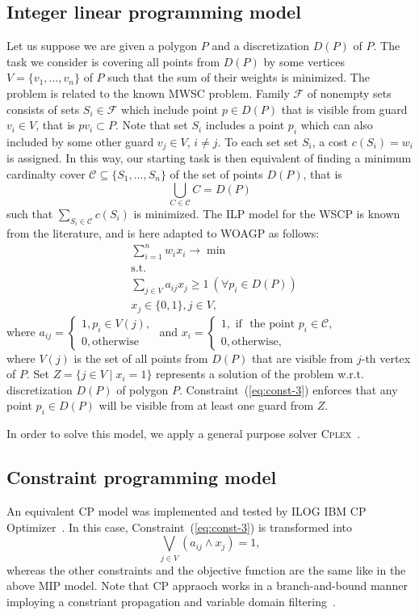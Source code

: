 \documentclass[runningheads,a4paper]{elsarticle}
\begin{document}
	\subsection{Integer linear programming model}
	Let us suppose we are given a polygon $P$ and a discretization $D(P)$ of $P$.  The task we consider is covering all points from $D(P)$ by some vertices $V=\{v_1,...,v_n\}$ of $P$ such that the sum of their weights is minimized.
	The problem is related to the known MWSC problem.
	Family $\mathcal{F}$ of nonempty sets consists of sets
	$S_i \in \mathcal{F}$ which include point $p \in D(P)$ that is visible from guard $v_i\in V$, that is $pv_i \subset P$.  Note that set $S_i$ includes a point $p_i$ which can also included by some other guard $v_j\in V$, $i \neq j$. To each set set $S_i$, a cost $c(S_i) = w_i$ is assigned.  In this way, our starting task is then equivalent of finding a minimum cardinalty cover $\mathcal{C}\subseteq\{S_1,...,S_n\}$ of the set of points $D(P)$, that is
	$$ \bigcup_{C \in \mathcal{C}} C = D(P)$$ such that $\sum_{S_i \in \mathcal{C}} c(S_i)$ is minimized.  The ILP  model for the WSCP is known from the literature, and is here adapted to WOAGP  as follows:
	\begin{align}
	&\sum_{i=1}^n w_ix_i \longrightarrow \min \\
	&\mbox{s.t.} \\
	&\sum_{j\in V} a_{ij}x_j \geq 1\ (\forall p_i\in D(P)) \label{eq:const-3}\\
	& x_j \in \{0,1\}, j \in V,
	\end{align}
	where
	$a_{ij} = \begin{cases}
	1, p_i \in V(j), \\
	0, \mbox{otherwise}
	\end{cases}$
	and $x_i = \begin{cases}
	1, \mbox{ if } \mbox{ the point } p_i \in \mathcal{C},\\
	0, \mbox{otherwise},
	\end{cases}$ \\
	where $V(j)$ is the set of all points from $D(P)$ that are visible from $j$-th vertex of $P$.
	Set $Z = \{j \in V\mid x_i=1\}$ represents a solution of the problem w.r.t. discretization $D(P)$ of polygon $P$.
	Constraint~(\ref{eq:const-3}) enforces that any point $p_i \in D(P)$ will be visible from at least one guard from $Z$.
	
	
	In order to solve this model, we apply a general purpose solver \textsc{Cplex}~\cite{lima2010ibm}.
	\subsection{Constraint programming model} An equivalent CP model was implemented and tested by ILOG IBM CP Optimizer~\cite{}. In this case,  Constraint~(\ref{eq:const-3}) is transformed into
	\begin{equation}
	\bigvee_{ j \in V } (a_{ij} \wedge x_j) = 1,
	\end{equation}
	whereas the other constraints and the objective function are the same like in the above MIP model. Note that CP appraoch works in a branch-and-bound manner imploying a constriant propagation and variable domain filtering~\cite{laborie2018ibm}.
\end{document}

